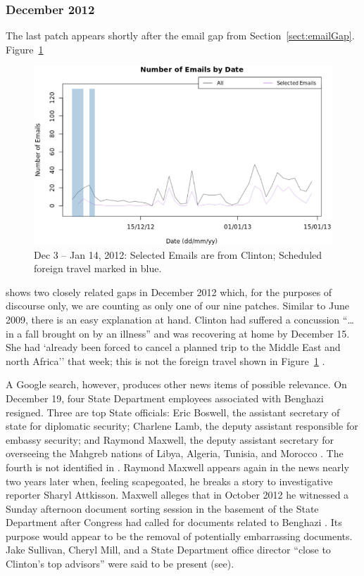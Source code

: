 \documentclass[journal]{vgtc}                %
\begin{document}
\subsubsection{December 2012}
The last patch appears 
shortly after the email gap from Section~\ref{sect:emailGap}.  Figure~\ref{fig:ZeroEmailsDec2012}
\begin{figure}[h]
\begin{center}
\includegraphics[width=0.95\linewidth]{ZeroEmailsDec2012}
\caption{Dec 3 -- Jan 14, 2012:  Selected Emails are from Clinton; Scheduled foreign travel marked in blue.}
\label{fig:ZeroEmailsDec2012}
\end{center}
\end{figure}
shows two closely related gaps in December 2012 which, for the purposes of discourse only,  we are counting as only one of our 
nine
patches.  Similar to June 2009, there is an easy explanation at hand.  Clinton had suffered a concussion ``\ldots in a fall brought on by an illness'' \cite{concussion} and was recovering at home by December 15.  She had `already been forced to cancel a planned trip to the Middle East and north Africa'' \cite{concussion} that week; this is not the foreign travel shown in Figure~\ref{fig:ZeroEmailsDec2012} \cite{ForeignSched}.  

A Google search,  however, produces other news items of possible relevance.  On  December 19, four State Department employees associated with Benghazi resigned.  Three are top State officials: Eric Boswell,  the assistant secretary of state for diplomatic security;  Charlene Lamb, the deputy assistant responsible for embassy security; and Raymond Maxwell, the deputy assistant secretary for overseeing the Mahgreb nations of Libya, Algeria, Tunisia, and Morocco \cite{securityResigns, fourResign, tripoliPostResign}.  The fourth is not identified in \cite{fourResign, tripoliPostResign}.   Raymond Maxwell appears again in the news nearly two years later when, feeling scapegoated, he breaks a story to investigative reporter Sharyl Attkisson.  Maxwell alleges that in October 2012 he witnessed a Sunday afternoon document sorting session in the basement of the State Department after Congress had called for documents related to Benghazi \cite{AttkissonBenghaziBombshell, attkissonTimeline}.  Its purpose would appear to be the removal of potentially embarrassing documents.  Jake Sullivan,  Cheryl Mill, and a State Department office director ``close to Clinton's top advisors''  were said to be present (see\cite{AttkissonBenghaziBombshell}).
\end{document}
